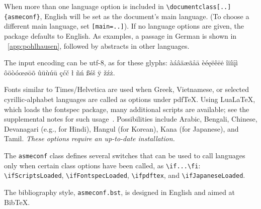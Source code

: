 \documentclass[colorlinks,upint,subscriptcorrection,varvw,hyphenate,balance,greek,russian,vietnamese,german]{asmeconf} %
\newcommand*\pdfTeX{pdf\TeX}
\newcommand*\LuaLaTeX{Lua\LaTeX}
\newcommand*\BibTeX{Bib\TeX}
\begin{document}
When more than one language option is included in \verb|\documentclass[..]{asmeconf}|, English will be 
set as the document's main language. (To choose a different main language, set \texttt{[main=..]}).
If no language options are given, the package defaults to English.  As examples, a passage in German is 
shown in  \appendixname~\ref{app:pohlhausen},
followed by abstracts in other languages.

The input encoding can be utf-8, as for these glyphs:
%
àáâäæãåā  èéęëêēė  îïíīįì ôöòóœøōõ ûüùúū çćč ł ñń ßśš ÿ žźż.

Fonts similar to Times/Helvetica are used when Greek, Vietnamese, or selected cyrillic-alphabet languages are called as options under {\upshape\pdfTeX}. Using {\upshape\LuaLaTeX}, which loads the fontspec package, many additional scripts are available; see the supplemental notes for such usage~\cite{lienhard2021}. Possibilities include Arabic, Bengali, Chinese, Devanagari (e.g., for Hindi), Hangul (for Korean), Kana (for Japanese), and Tamil. \emph{These options require an up-to-date \upshape{\LaTeX} installation.}

The \texttt{asmeconf} class defines several switches that can be used to call languages only when certain class options have been called, as \verb|\if...\fi|: \verb|\ifScriptsLoaded|, \verb|\ifFontspecLoaded|, \verb|\ifpdftex|, and \verb|\ifJapaneseLoaded|.

The bibliography style, \texttt{asmeconf.bst}, is designed in English and aimed at \BibTeX.  

\end{document}
